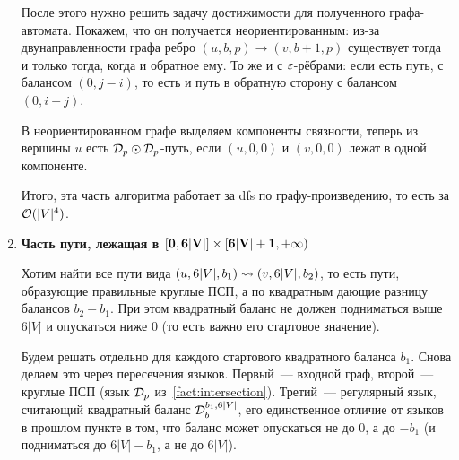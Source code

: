 \begin{enumerate}



    После этого нужно решить задачу достижимости для полученного графа-автомата. Покажем, что он получается неориентированным: из-за двунаправленности графа ребро $(u, b, p) \to (v, b+1, p)$ существует тогда и только тогда, когда и обратное ему. То же и с $\varepsilon$-рёбрами: если есть путь, с балансом $(0, j-i)$, то есть и путь в обратную сторону с балансом $(0, i-j)$.

    В неориентированном графе выделяем компоненты связности, теперь из вершины $u$ есть $\mathcal{D}_p \odot \mathcal{D}_p$-путь, если $(u, 0, 0)$ и $(v, 0, 0)$ лежат в одной компоненте.

    Итого, эта часть алгоритма работает за dfs по графу-произведению, то есть за $\mathcal{O}(|V|^4)$.


    \item {\bf Часть пути, лежащая в $\mathbf{[0, 6|V|] \times [6|V| + 1, +\infty)}$}



    Хотим найти все пути вида $(u, 6|V|, b_1) \rightsquigarrow (v, 6|V|, b_2)$, то есть пути, образующие правильные круглые ПСП, а по квадратным дающие разницу балансов $b_2 - b_1$. При этом квадратный баланс не должен подниматься выше $6|V|$ и опускаться ниже 0 (то есть важно его стартовое значение).

    Будем решать отдельно для каждого стартового квадратного баланса $b_1$. Снова делаем это через пересечения языков. Первый~--- входной граф, второй~--- круглые ПСП (язык $\mathcal{D}_p$ из~\ref{fact:intersection}). Третий~--- регулярный язык, считающий квадратный баланс $\mathcal{D}_b^{b_1, 6|V|}$, его единственное отличие от языков в прошлом пункте в том, что баланс может опускаться не до 0, а до $-b_1$ (и подниматься до $6|V| - b_1$, а не до $6|V|$).


\end{enumerate}
